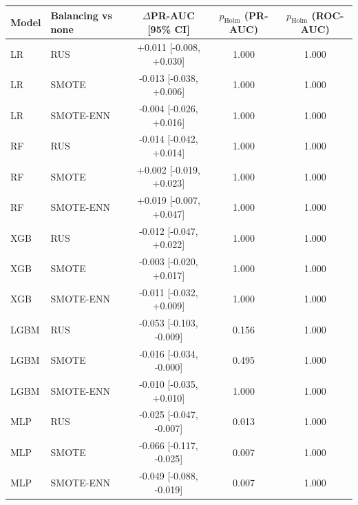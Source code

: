 \begin{tabular}{llccc}
\hline
Model & Balancing vs none & $\Delta$PR-AUC [95\% CI] & $p_{\mathrm{Holm}}$ (PR-AUC) & $p_{\mathrm{Holm}}$ (ROC-AUC) \\
\hline
LR & RUS & +0.011 [-0.008, +0.030] & 1.000 & 1.000 \\
LR & SMOTE & -0.013 [-0.038, +0.006] & 1.000 & 1.000 \\
LR & SMOTE-ENN & -0.004 [-0.026, +0.016] & 1.000 & 1.000 \\
RF & RUS & -0.014 [-0.042, +0.014] & 1.000 & 1.000 \\
RF & SMOTE & +0.002 [-0.019, +0.023] & 1.000 & 1.000 \\
RF & SMOTE-ENN & +0.019 [-0.007, +0.047] & 1.000 & 1.000 \\
XGB & RUS & -0.012 [-0.047, +0.022] & 1.000 & 1.000 \\
XGB & SMOTE & -0.003 [-0.020, +0.017] & 1.000 & 1.000 \\
XGB & SMOTE-ENN & -0.011 [-0.032, +0.009] & 1.000 & 1.000 \\
LGBM & RUS & -0.053 [-0.103, -0.009] & 0.156 & 1.000 \\
LGBM & SMOTE & -0.016 [-0.034, -0.000] & 0.495 & 1.000 \\
LGBM & SMOTE-ENN & -0.010 [-0.035, +0.010] & 1.000 & 1.000 \\
MLP & RUS & -0.025 [-0.047, -0.007] & 0.013 & 1.000 \\
MLP & SMOTE & -0.066 [-0.117, -0.025] & 0.007 & 1.000 \\
MLP & SMOTE-ENN & -0.049 [-0.088, -0.019] & 0.007 & 1.000 \\
\hline
\end{tabular}
